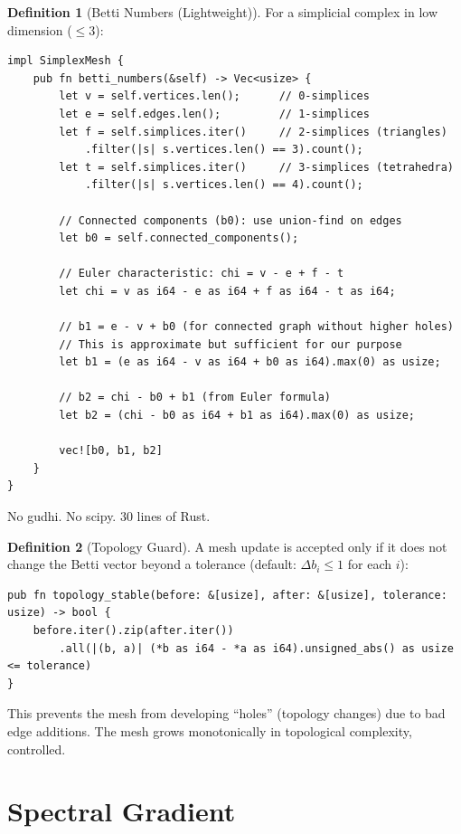 \documentclass[11pt,a4paper,twoside]{article}
\theoremstyle{definition}
\newtheorem{definition}{Definition}[section]
\theoremstyle{plain}
\theoremstyle{remark}
\begin{document}
\begin{definition}[Betti Numbers (Lightweight)]\label{def:betti}
For a simplicial complex in low dimension ($\le 3$):
\begin{lstlisting}
impl SimplexMesh {
    pub fn betti_numbers(&self) -> Vec<usize> {
        let v = self.vertices.len();      // 0-simplices
        let e = self.edges.len();         // 1-simplices
        let f = self.simplices.iter()     // 2-simplices (triangles)
            .filter(|s| s.vertices.len() == 3).count();
        let t = self.simplices.iter()     // 3-simplices (tetrahedra)
            .filter(|s| s.vertices.len() == 4).count();

        // Connected components (b0): use union-find on edges
        let b0 = self.connected_components();

        // Euler characteristic: chi = v - e + f - t
        let chi = v as i64 - e as i64 + f as i64 - t as i64;

        // b1 = e - v + b0 (for connected graph without higher holes)
        // This is approximate but sufficient for our purpose
        let b1 = (e as i64 - v as i64 + b0 as i64).max(0) as usize;

        // b2 = chi - b0 + b1 (from Euler formula)
        let b2 = (chi - b0 as i64 + b1 as i64).max(0) as usize;

        vec![b0, b1, b2]
    }
}
\end{lstlisting}
No gudhi. No scipy. 30 lines of Rust.
\end{definition}

\begin{definition}[Topology Guard]\label{def:topoguard}
A mesh update is accepted only if it does not change the Betti
vector beyond a tolerance (default: $\Delta b_i \le 1$ for each $i$):
\begin{lstlisting}
pub fn topology_stable(before: &[usize], after: &[usize], tolerance: usize) -> bool {
    before.iter().zip(after.iter())
        .all(|(b, a)| (*b as i64 - *a as i64).unsigned_abs() as usize <= tolerance)
}
\end{lstlisting}
This prevents the mesh from developing ``holes'' (topology changes)
due to bad edge additions. The mesh grows monotonically in
topological complexity, controlled.
\end{definition}


\section{Spectral Gradient}\label{sec:gradient}
\end{document}
